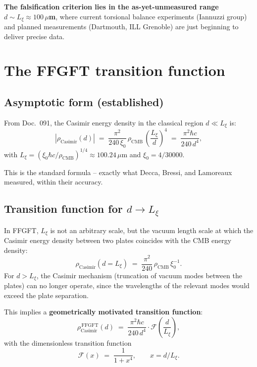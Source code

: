 \textbf{The falsification criterion lies in the as-yet-unmeasured
range $d \sim L_\xi \approx 100\,\mu$m}, where current torsional
balance experiments (Iannuzzi group) and planned measurements
(Dartmouth, ILL Grenoble) are just beginning to deliver precise
data.

\section{The FFGFT transition function}
\label{sec:prediction}

\subsection{Asymptotic form (established)}

From Doc.~091, the Casimir energy density in the classical region
$d \ll L_\xi$ is:
\begin{equation}
  |\rho_\text{Casimir}(d)|
  \;=\; \frac{\pi^2}{240\,\xi_0}\,\rho_\text{CMB}\,
        \left(\frac{L_\xi}{d}\right)^4
  \;=\; \frac{\pi^2 \hbar c}{240\,d^4},
  \label{eq:casimir-asymptotic}
\end{equation}
with $L_\xi = (\xi_0\hbar c/\rho_\text{CMB})^{1/4} \approx 100.24\,\mu$m
and $\xi_0 = 4/30000$.

This is the standard formula -- exactly what Decca, Bressi, and
Lamoreaux measured, within their accuracy.

\subsection{\texorpdfstring{Transition function for $d \to L_\xi$}{Transition function for d to L_xi}}

In FFGFT, $L_\xi$ is not an arbitrary scale, but the vacuum length
scale at which the Casimir energy density between two plates
coincides with the CMB energy density:
\begin{equation}
  \rho_\text{Casimir}(d = L_\xi)
  \;=\; \frac{\pi^2}{240}\,\rho_\text{CMB}\,\xi_0^{-1}.
\end{equation}
For $d > L_\xi$, the Casimir mechanism (truncation of vacuum modes
between the plates) can no longer operate, since the wavelengths of
the relevant modes would exceed the plate separation.

This implies a \textbf{geometrically motivated transition function}:
\begin{equation}
  \rho_\text{Casimir}^{\,\text{FFGFT}}(d)
  \;=\; \frac{\pi^2 \hbar c}{240\,d^4}
        \cdot \mathcal{F}\!\left(\frac{d}{L_\xi}\right),
  \label{eq:ffgft-form}
\end{equation}
with the dimensionless transition function
\begin{equation}
  \mathcal{F}(x) \;=\; \frac{1}{1 + x^4},
  \qquad x = d/L_\xi.
  \label{eq:transition}
\end{equation}

